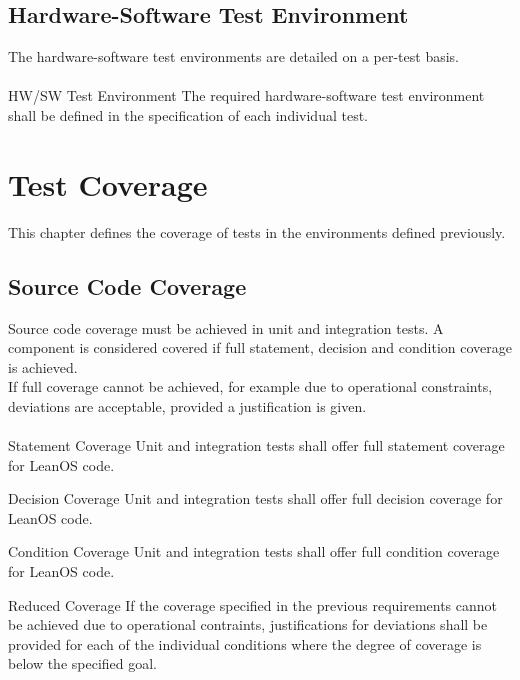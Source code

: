 \section{Hardware-Software Test Environment}

The hardware-software test environments are detailed on a per-test basis.\\
\\

 {HW/SW Test Environment}{%
The required hardware-software test environment shall be defined in the %
specification of each individual test.%
}{}%

\chapter{Test Coverage}

This chapter defines the coverage of tests in the environments defined
previously.


\section{Source Code Coverage}

Source code coverage must be achieved in unit and integration tests.
A component is considered covered if full statement, decision and condition
coverage is achieved. \\

\noindent
If full coverage cannot be achieved, for example due to operational constraints,
deviations are acceptable, provided a justification is given.\\
\\

 {Statement Coverage}{%
Unit and integration tests shall offer full statement coverage for LeanOS code.%
}{}%

 {Decision Coverage}{%
Unit and integration tests shall offer full decision coverage for LeanOS code.%
}{}%

 {Condition Coverage}{%
Unit and integration tests shall offer full condition coverage for LeanOS code.%
}{}%

 {Reduced Coverage}{%
If the coverage specified in the previous requirements cannot be achieved %
due to operational contraints, justifications for deviations shall be provided %
for each of the individual conditions where the degree of coverage is below %
the specified goal. %
}{}%











